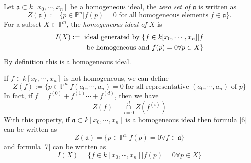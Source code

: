 \begin{definition}
	Let $ \mathfrak{a}\subset k[x_0,\cdots,x_n] $ be a homogeneous ideal, the \textit{zero set of $ \mathfrak{a} $} is written as
	\begin{equation}
		Z(\mathfrak{a}):=\{ p\in \mathbb{P}^n|f(p)=0 \text{ for all homogeneous elements } f\in \mathfrak{a} \}.\label{6}
	\end{equation}
	For a subset $ X\subset \mathbb{P}^n $, the \textit{homogeneous ideal of $ X $} is
	\begin{align}
		I(X):= \text{ ideal generated by } \{ f\in k[x_0,\cdots,x_n]|f \label{7} \\
		\text{ be homogeneous and } f(p)=0 \forall p\in X \}\notag
	\end{align}
	By definition this is a homogeneous ideal.
\end{definition}
\begin{remark}
	If $ f\in k[x_0,\cdots,x_n] $ is not homogeneous, we can define
	\begin{equation}
		Z(f):=\{ p\in\mathbb{P}^n| f(a_0,\cdots,a_n)=0\text{ for all representative } (a_0,\cdots,a_n) \text{ of } p \}
	\end{equation}
	In fact, if $ f=f^{(0)}+f^{(1)}\cdots +f^{(d)} $, then we have
	\begin{equation}
		Z(f)=\mathop{\cap}\limits_{i=0}^{d}Z(f^{(i)})
	\end{equation}
	With this property, if $ \mathfrak{a} \subset k[x_0,\cdots,x_n]$ is a homogeneous ideal then formula \ref{6} can be written as
	\begin{equation}
		Z(\mathfrak{a})=\{ p\in \mathbb{P}^n| f(p)=0 \forall f\in \mathfrak{a} \}
	\end{equation}
	and formula \ref{7} can be written as
	\begin{equation}
		I(X)=\{ f\in k[x_0,\cdots,x_n]|f(p)=0 \forall p\in X \}
	\end{equation}
\end{remark}

